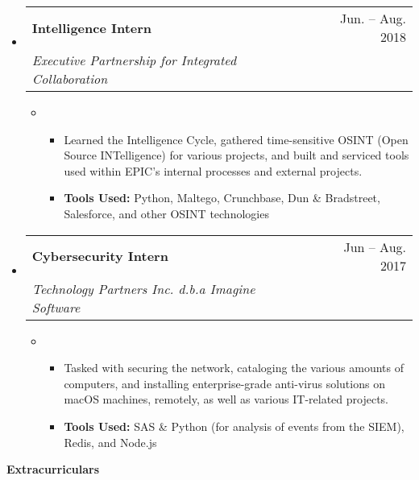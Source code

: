 \documentclass[letterpaper,10pt,draft]{article}
\makeatletter
\newlength{\outerbordwidth}
\newcommand{\openitem}[2]{\item[] \textbf{#1} #2\vspace{2pt}}
\newcommand{\secheading}[1]{\vspace{2pt}
{
\setlength{\FrameSep}{\outerbordwidth}
\textbf{\large #1}
}
}
\newcommand{\secsubheading}[4]{
\vspace{2pt}
\begin{tabular*}{6.86in}{l@{\cftdotfill{\cftsecdotsep}\extracolsep{\fill}}r}
\textbf{#1} & #3 -- #4\\
\textit{#2} \\
\end{tabular*}
}
\newcommand{\secitem}[5]{
\item[]
\secsubheading{#1}{#2}{#3}{#4}
\vspace{-10pt}
\begin{itemize}
\item[]{#5}
\end{itemize}
}
\makeatother
\begin{document}
\begin{itemize}
\secitem{Intelligence Intern}
{Executive Partnership for Integrated Collaboration}
{Jun.}{Aug. 2018}
{
\begin{itemize}
\openitem{}{Learned the Intelligence Cycle, gathered time-sensitive OSINT (Open Source INTelligence) for various projects, and built and serviced tools used within EPIC’s internal processes and external projects.}
\openitem{\bf Tools Used:}{Python, Maltego, Crunchbase, Dun \& Bradstreet, Salesforce, and other OSINT technologies}
\end{itemize}
}

\secitem{Cybersecurity Intern}
{Technology Partners Inc. d.b.a Imagine Software}
{Jun}{Aug. 2017}
{
\begin{itemize}
\openitem{}{Tasked with securing the network, cataloging the various amounts of computers, and installing enterprise-grade anti-virus solutions on macOS machines, remotely, as well as various IT-related projects.}
\openitem{\bf Tools Used:}{SAS \& Python (for analysis of events from the SIEM), Redis, and Node.js}
\end{itemize}
}
\end{itemize}


\secheading{Extracurriculars}
\end{document}
